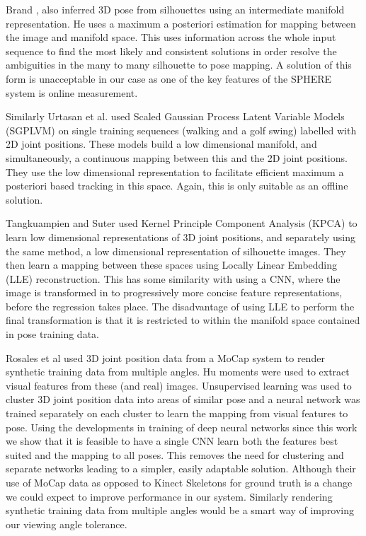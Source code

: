 \documentclass[11pt]{article} %
\begin{document}
Brand \cite{Brand1999}, also inferred 3D pose from silhouettes using an intermediate manifold representation. He uses a maximum a posteriori estimation for mapping between the image and manifold space. This uses information across the whole input sequence to find the most likely and consistent solutions in order resolve the ambiguities in the many to many silhouette to pose mapping. A solution of this form is unacceptable in our case as one of the key features of the SPHERE system is online measurement.

Similarly Urtasan et al. \cite{Urtasun2005} used Scaled Gaussian Process Latent Variable Models (SGPLVM) \cite{Lawrence2004} on single training sequences (walking and a golf swing) labelled with 2D joint positions. These models build a low dimensional manifold, and simultaneously, a continuous mapping between this and the 2D joint positions. They use the low dimensional representation to facilitate efficient maximum a posteriori based tracking in this space. Again, this is only suitable as an offline solution. 

Tangkuampien and Suter \cite{Tangkuampien2006} used Kernel Principle Component Analysis (KPCA) to learn low dimensional representations of 3D joint positions, and separately using the same method, a low dimensional representation of silhouette images. They then learn a mapping between these spaces using Locally Linear Embedding (LLE) reconstruction. This has some similarity with using a CNN, where the image is transformed in to progressively more concise feature representations, before the regression takes place. The disadvantage of using LLE to perform the final transformation is that it is restricted to within the manifold space contained in pose training data. %

Rosales et al \cite{Rosales2000,Rosales2001} used 3D joint position data from a MoCap system to render synthetic training data from multiple angles. Hu moments were used to extract visual features from these (and real) images. Unsupervised learning was used to cluster 3D joint position data into areas of similar pose and a neural network was trained separately on each cluster to learn the mapping from visual features to pose. Using the developments in training of deep neural networks since this work we show that it is feasible to have a single CNN learn both the features best suited and the mapping to all poses. This removes the need for clustering and separate networks leading to a simpler, easily adaptable solution. Although their use of MoCap data as opposed to Kinect Skeletons for ground truth is a change we could expect to improve performance in our system. Similarly rendering synthetic training data from multiple angles would be a smart way of improving our viewing angle tolerance.
\end{document}
